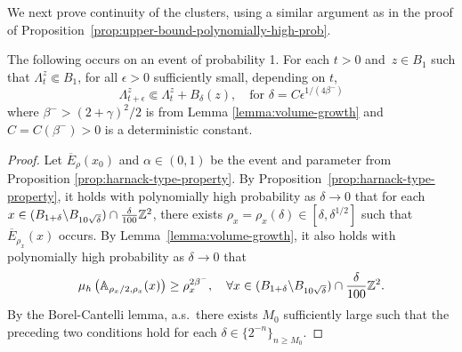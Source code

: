 \documentclass[12pt]{amsart}
\numberwithin{equation}{section}
\newcommand{\cluster}[2]{\hyperref[eq:non-co-set]{\mathit{\Lambda}^{#1}_{#2}}}
\begin{document}
	
	We next prove continuity of the clusters, using a similar argument as in the proof of Proposition~\ref{prop:upper-bound-polynomially-high-prob}.   
	
	\begin{prop} \label{prop:continuity-of-clusters}
		The following occurs on an event of probability 1. 
		For each $t > 0$ and~$z \in B_1$ such that ${\cluster{z}{t}} \Subset B_1$, for all $\epsilon > 0$ sufficiently small, depending on $t$,
		\[
		{\cluster{z}{t + \epsilon}} \Subset {\cluster{z}{t}} + B_{\delta}(z) ,\quad \text{for $\delta = C \epsilon^{1/(4\beta^-)}$}
		\]
		where $\beta^- > (2+\gamma)^2/2$ is from Lemma \ref{lemma:volume-growth} and  $C = C(\beta^-) >0$ is a deterministic constant. 
	\end{prop}
	
	\begin{proof}
		Let $\overline E_{\rho}(x_0)$ and $\alpha \in (0,1)$ be the event and parameter from Proposition \ref{prop:harnack-type-property}.
		By Proposition~\ref{prop:harnack-type-property}, it holds with polynomially high probability as $\delta \to 0$ that for each $x\in (B_{1 + \delta} \backslash B_{10 \sqrt{\delta}}) \cap \frac{\delta}{100} \mathbb{Z}^2$, there exists $\rho_x = \rho_x(\delta) \in [\delta,\delta^{1/2}]$ such that $\overline E_{\rho_x}(x)$ occurs. 
		By Lemma~\ref{lemma:volume-growth}, it also holds with polynomially high probability as $\delta \to 0$ that 
		\begin{equation} \label{eq:volume-growth-lower-bound}
		\mu_h\left( \mathbb{A}_{\rho_x/2, \rho_x}(x ) \right)  \geq \rho_x^{2 \beta^-}, \quad \forall x \in (B_{1 + \delta } \backslash B_{10 \sqrt{\delta }})  \cap \frac{\delta }{100} \mathbb{Z}^2 .
		\end{equation}
		By the Borel-Cantelli lemma, a.s.\ there exists $M_0$ sufficiently large such that the preceding two conditions hold for each $\delta \in \{2^{-n}\}_{n \geq M_0}$.
		
		
		

\end{proof}
\end{document}
